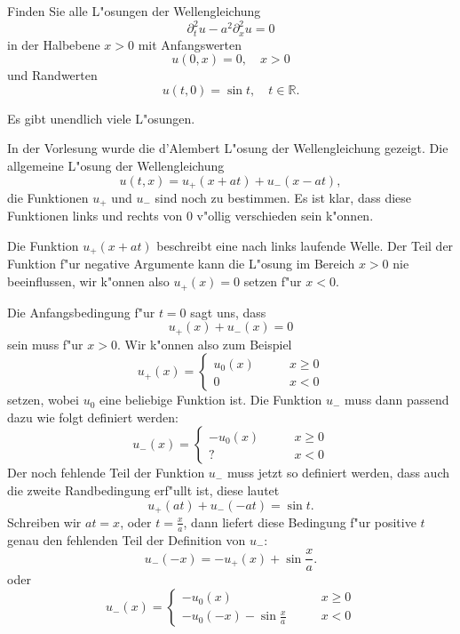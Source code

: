 Finden Sie alle L"osungen der Wellengleichung
\[
\partial_t^2u-a^2\partial_x^2u=0
\]
in der Halbebene $x>0$ mit Anfangswerten
\[
u(0,x)=0,\quad x>0
\]
und Randwerten
\[
u(t,0)=\sin t,\quad t\in\mathbb R.
\]

\begin{hinweis}
Es gibt unendlich viele L"osungen.
\end{hinweis}

\begin{loesung}
In der Vorlesung wurde die d'Alembert L"osung der Wellengleichung
gezeigt. Die allgemeine L"osung der Wellengleichung
\[
u(t,x)
=
u_+(x+at)+u_-(x-at),
\]
die Funktionen $u_+$ und $u_-$ sind noch zu bestimmen. Es ist klar,
dass diese Funktionen links und rechts von $0$ v"ollig verschieden sein
k"onnen.

Die Funktion $u_+(x+at)$ beschreibt eine nach links laufende
Welle. Der Teil der Funktion f"ur negative Argumente kann
die L"osung im Bereich $x>0$ nie
beeinflussen, wir k"onnen also $u_+(x)=0$ setzen f"ur $x<0$.

Die Anfangsbedingung f"ur $t=0$ sagt uns, dass
\[
u_+(x)+u_-(x)=0
\]
sein muss f"ur $x>0$. Wir k"onnen also zum Beispiel
\[
u_+(x)=\begin{cases}u_0(x)&\qquad x\ge 0\\
0&\qquad x<0
\end{cases}
\]
setzen, wobei $u_0$ eine beliebige Funktion ist. Die Funktion $u_-$ muss
dann passend dazu wie folgt definiert werden:
\[
u_-(x)=\begin{cases}
-u_0(x)&\qquad x\ge 0\\
?&\qquad x<0
\end{cases}
\]
Der noch fehlende Teil der Funktion $u_-$ muss jetzt so definiert werden,
dass auch die zweite Randbedingung erf"ullt ist, diese lautet
\[
u_+(at)+u_-(-at)=\sin t.
\]
Schreiben wir $at=x$, oder $t=\frac{x}{a}$, dann liefert diese Bedingung
f"ur positive $t$ genau den fehlenden Teil der Definition von $u_-$:
\[
u_-(-x)=-u_+(x)+\sin \frac{x}{a}.
\]
oder
\[
u_-(x)=\begin{cases}
-u_0(x)&\qquad x\ge 0\\
-u_0(-x)-\sin{\displaystyle\frac{x}{a}}&\qquad x<0
\end{cases}
\]
\end{loesung}
